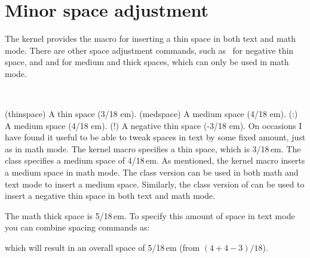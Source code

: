 \section{Minor space adjustment}

    The kernel provides the \cmd{\,} macro for inserting a thin space in both
text and math mode. There are
other space adjustment commands, such as \pixabang\ for negative thin space, 
and \cmd{\:} and \cmd{\;} for medium
and thick spaces, which can only be used in math mode.

\begin{syntax}
\cmd{\thinspace} \cmd{\medspace} \cmd{\:} \pixabang \\
\end{syntax}
\glossary(thinspace)%
  {}%
  {A thin space (3/18 em).}
\glossary(medspace)%
  {}%
  {A medium space (4/18 em).}
\glossary(:)%
  {\cs{:}}%
  {A medium space (4/18 em).}
\glossary(!)%
  {\cs{!}}%
  {A negative thin space (-3/18 em).}
On occasions I have found it useful to be able to tweak spaces in text by some
fixed amount, just as in math mode. The kernel macro \cmd{\thinspace}
specifies a thin space, which is 3/18\,em. 
The class \cmd{\medspace} specifies a medium space of 4/18\,em. 
As mentioned, the kernel macro \cmd{\:} inserts
a medium space in math mode. The class version can be used in both math and
text mode to insert a medium space. Similarly, the class version of 
\pixabang{}
can be used to insert a negative thin space in both text and math mode.

    The math thick space is 5/18\,em. 
To specify this amount of space
in text mode you can combine spacing commands as:
\begin{lcode}
\:\:\!
\end{lcode}
which will result in an overall space of 5/18\,em 
(from $(4 + 4 - 3)/18$).

